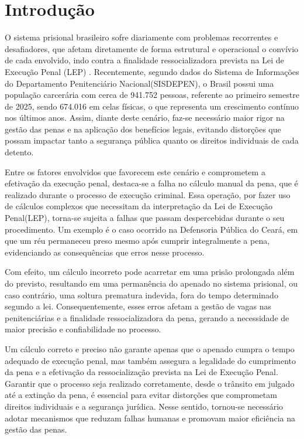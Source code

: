 \chapter{Introdução}

O sistema prisional brasileiro sofre diariamente com problemas recorrentes e desafiadores, que afetam diretamente de forma estrutural e operacional o convívio de cada envolvido, indo contra a finalidade ressocializadora prevista na Lei de Execução Penal (LEP) . Recentemente, segundo dados do Sistema de Informações do Departamento Penitenciário Nacional(SISDEPEN), o Brasil possui uma população carcerária com cerca de  941.752 pessoas, referente ao primeiro semestre de 2025, sendo 674.016 em celas físicas, o que representa um crescimento contínuo nos 
últimos anos. Assim, diante deste cenário, faz-se necessário maior rigor na gestão das penas e na aplicação dos benefícios legais, evitando distorções que possam impactar tanto a segurança pública quanto os direitos individuais de cada detento.\cite{senappen2025, lei12714}

Entre os fatores envolvidos que favorecem este cenário e comprometem a efetivação da execução penal, destaca-se a falha no cálculo manual da pena, que é realizado durante o processo de execução criminal.  Essa operação, por fazer uso de cálculos complexos que necessitam da interpretação da Lei de Execução Penal(LEP), torna-se sujeita a falhas que passam despercebidas durante o seu procedimento. Um exemplo é o caso ocorrido na Defensoria Pública do Ceará, em que um réu permaneceu preso mesmo após cumprir integralmente a pena, evidenciando as consequências que erros nesse processo\cite{lep, defensoriaCE}.

Com efeito, um cálculo incorreto pode acarretar em uma prisão prolongada além do previsto, resultando em uma permanência do apenado no sistema prisional, ou caso contrário, uma soltura prematura indevida, fora do tempo determinado segundo a lei. Consequentemente, esses erros afetam a gestão de vagas nas penitenciárias e a finalidade ressocializadora da pena, gerando a necessidade de maior precisão e confiabilidade no processo. \cite{defensoriaCE}

Um cálculo correto e preciso não garante apenas que o apenado cumpra o tempo adequado de execução penal, mas também assegura a legalidade do cumprimento da pena e a efetivação da ressocialização prevista na Lei de Execução Penal. Garantir que o processo seja realizado corretamente, desde o trânsito em julgado até a extinção da pena, é essencial para evitar distorções que comprometam direitos individuais e a segurança jurídica. Nesse sentido, tornou-se necessário adotar mecanismos que reduzam falhas humanas e promovam maior eficiência na gestão das penas.\cite{lep}

